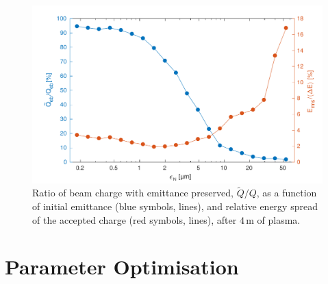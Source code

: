 \documentclass[aps,prstab,reprint,amsmath,amssymb,groupedaddress]{revtex4-1}
\newcommand{\unit}[1]{\,\mathrm{#1}}
\begin{document}
\begin{figure}[hbt]
    \includegraphics[width=\linewidth,trim={2mm 0mm 2mm 0mm},clip]{figures/beamQualityEmittance}
    \caption{\label{Fig:BeamQEmit} Ratio of beam charge with emittance preserved, $\widetilde{Q}/Q$, as a function of
        initial emittance (blue symbols, lines), and relative energy spread of the accepted charge (red symbols, lines),
        after $4\unit{m}$ of plasma.}
\end{figure}

\section{Parameter Optimisation}\label{S:PO}
\end{document}

